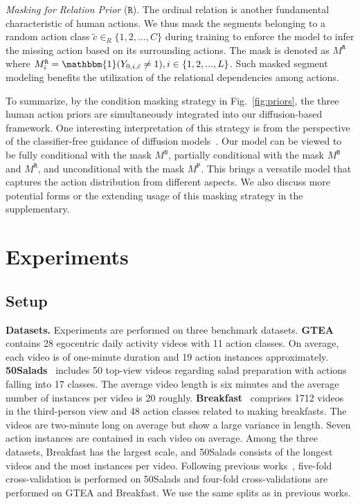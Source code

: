 \documentclass[10pt,twocolumn,letterpaper]{article}
\begin{document}
\textit{Masking for Relation Prior} ($\mathtt{R}$). 
The ordinal relation is another fundamental characteristic of human actions. 
We thus mask the segments belonging to a random action class $\tilde{c} \in_R \{1, 2, ..., C\}$ during training to enforce the model to infer the missing action based on its surrounding actions.
The mask is denoted as $M^\mathtt{R}$ where $M^\mathtt{R}_i = \mathbbm{1}(Y_{0,i,\tilde{c}}\neq1), i \in \{1,2,...,L\}$.
Such masked segment modeling benefits the utilization of the relational dependencies among actions.

To summarize, by the condition masking strategy in Fig.~\ref{fig:priors}, the three human action priors are simultaneously integrated into our diffusion-based framework.
One interesting interpretation of this strategy is from the perspective of the classifier-free guidance of diffusion models~\cite{CFGuidance}.
Our model can be viewed to be fully conditional with the mask $M^\mathtt{N}$, partially conditional with the mask $M^\mathtt{B}$ and $M^\mathtt{R}$, and unconditional with the mask $M^\mathtt{P}$.
This brings a versatile model that captures the action distribution from different aspects.
We also discuss more potential forms or the extending usage of this masking strategy in the supplementary.






\section{Experiments}

\subsection{Setup}


\textbf{Datasets.}
Experiments are performed on three benchmark datasets. 
\textbf{GTEA}~\cite{GTEA} contains 28 egocentric daily activity videos with 11 action classes. 
On average, each video is of one-minute duration and 19 action instances approximately.
\textbf{50Salads}~\cite{50Salads} includes 50 top-view videos regarding salad preparation with actions falling into 17 classes.
The average video length is six minutes and the average number of instances per video is 20 roughly.
\textbf{Breakfast}~\cite{Breakfast} comprises 1712 videos in the third-person view and 48 action classes related to making breakfasts.
The videos are two-minute long on average but show a large variance in length.
Seven action instances are contained in each video on average.
Among the three datasets, Breakfast has the largest scale, and 50Salads consists of the longest videos and the most instances per video.
Following previous works~\cite{2022_CVPR_Li,2022_ECCV_Behrmann,2022_NeurIPS_Xu,2021_BMVC_Yi,2020_PAMI_Li,2021_WACV_Ishikawa,2019_CVPR_Farha}, five-fold cross-validation is performed on 50Salads and four-fold cross-validations are performed on GTEA and Breakfast. 
We use the same splits as in previous works.
\end{document}

